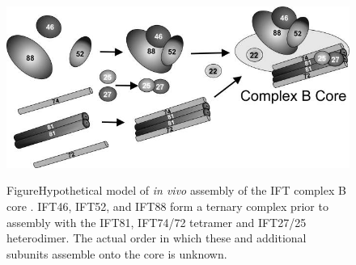 \begin{figure}[hbt]
\centering
\graphicspath{{figures/}}
\includegraphics[width=\textwidth-40mm]{fig2-14.jpg}
{
 {Figure}{Hypothetical model of \textit{in vivo} assembly of the IFT complex B core \citep{Lucker2010}. IFT46, IFT52, and IFT88 form a ternary complex prior to assembly with the IFT81, IFT74/72 tetramer and IFT27/25 heterodimer. The actual order in which these and additional subunits assemble onto the core is unknown.}
\par}
\end{figure}


